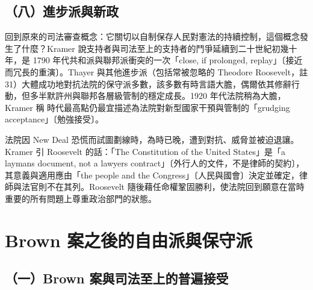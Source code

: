 \subsection{（八）進步派與新政}

回到原來的司法審查概念：它關切以自制保存人民對憲法的持續控制，這個概念發生了什麼？Kramer 說支持者與司法至上的支持者的鬥爭延續到二十世紀初幾十年，是 1790 年代共和派與聯邦派衝突的一次「close, if prolonged, replay」〔接近而冗長的重演〕。Thayer 與其他進步派（包括常被忽略的 Theodore Roosevelt，註 31）大體成功地對抗法院的保守派多數，該多數有時言語大膽，偶爾依其修辭行動，但多半默許州與聯邦各層級管制的穩定成長。1920 年代法院稍為大膽，Kramer 稱  時代最高點仍最宜描述為法院對新型國家干預與管制的「grudging acceptance」〔勉強接受〕。

法院因 New Deal 恐慌而試圖劃線時，為時已晚，遭到對抗、威脅並被迫退讓。Kramer 引 Roosevelt 的話：「The Constitution of the United States」是「a layman\textquotesingle s document, not a lawyer\textquotesingle s contract」〔外行人的文件，不是律師的契約〕，其意義與適用應由「the people and the Congress」〔人民與國會〕決定並確定，律師與法官則不在其列。Roosevelt 隨後藉任命權鞏固勝利，使法院回到願意在當時重要的所有問題上尊重政治部門的狀態。

\section{Brown 案之後的自由派與保守派}
\label{sec:Kramer-5}

\subsection{（一）Brown 案與司法至上的普遍接受}

